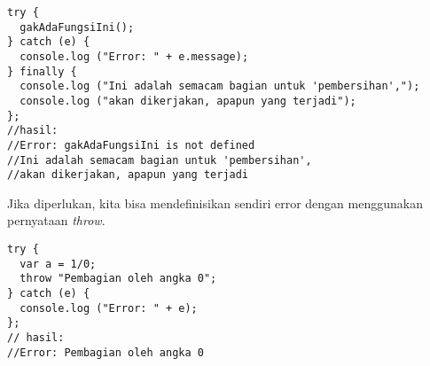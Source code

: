\begin{lstlisting}
try {
  gakAdaFungsiIni();
} catch (e) {
  console.log ("Error: " + e.message);
} finally {
  console.log ("Ini adalah semacam bagian untuk 'pembersihan',"); 
  console.log ("akan dikerjakan, apapun yang terjadi");
};
//hasil:
//Error: gakAdaFungsiIni is not defined
//Ini adalah semacam bagian untuk 'pembersihan', 
//akan dikerjakan, apapun yang terjadi
\end{lstlisting}

Jika diperlukan, kita bisa mendefinisikan sendiri error dengan menggunakan pernyataan \textit{throw}.

\begin{lstlisting}
try {
  var a = 1/0;
  throw "Pembagian oleh angka 0";
} catch (e) {
  console.log ("Error: " + e);
};
// hasil:
//Error: Pembagian oleh angka 0
\end{lstlisting}

